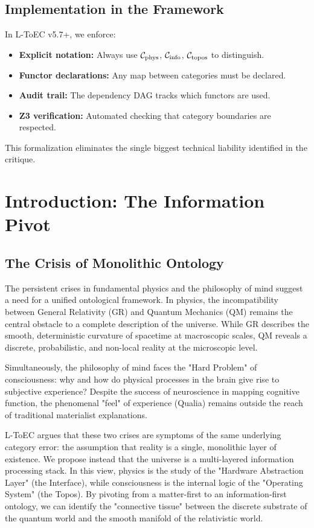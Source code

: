 \documentclass[11pt,titlepage]{article}
\begin{document}
\subsection{Implementation in the Framework}

In L-ToEC v5.7+, we enforce:
\begin{itemize}
    \item \textbf{Explicit notation:} Always use $\mathcal{C}_{\mathrm{phys}}$, $\mathcal{C}_{\mathrm{info}}$, $\mathcal{C}_{\mathrm{topos}}$ to distinguish.
    \item \textbf{Functor declarations:} Any map between categories must be declared.
    \item \textbf{Audit trail:} The dependency DAG tracks which functors are used.
    \item \textbf{Z3 verification:} Automated checking that category boundaries are respected.
\end{itemize}

This formalization eliminates the single biggest technical liability identified in the critique.
\section{Introduction: The Information Pivot}

\subsection{The Crisis of Monolithic Ontology}
The persistent crises in fundamental physics and the philosophy of mind suggest a need for a unified ontological framework. In physics, the incompatibility between General Relativity (GR) and Quantum Mechanics (QM) remains the central obstacle to a complete description of the universe. While GR describes the smooth, deterministic curvature of spacetime at macroscopic scales, QM reveals a discrete, probabilistic, and non-local reality at the microscopic level.

Simultaneously, the philosophy of mind faces the "Hard Problem" of consciousness: why and how do physical processes in the brain give rise to subjective experience? Despite the success of neuroscience in mapping cognitive function, the phenomenal "feel" of experience (Qualia) remains outside the reach of traditional materialist explanations.

L-ToEC argues that these two crises are symptoms of the same underlying category error: the assumption that reality is a single, monolithic layer of existence. We propose instead that the universe is a multi-layered information processing stack. In this view, physics is the study of the "Hardware Abstraction Layer" (the Interface), while consciousness is the internal logic of the "Operating System" (the Topos). By pivoting from a matter-first to an information-first ontology, we can identify the "connective tissue" between the discrete substrate of the quantum world and the smooth manifold of the relativistic world.
\end{document}
